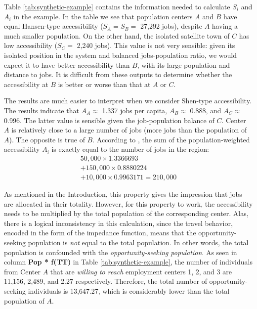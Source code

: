 \documentclass[]{elsarticle} %
\begin{document}
\begin{table}[ht]
\end{table}
 

Table \ref{tab:synthetic-example} contains the information needed to
calculate \(S_i\) and \(A_i\) in the example. In the table we see that
population centers \(A\) and \(B\) have equal Hansen-type accessibility
(\(S_A = S_B=\) 27,292 jobs), despite \(A\) having a much smaller
population. On the other hand, the isolated satellite town of \(C\) has
low accessibility (\(S_C=\) 2,240 jobs). This value is not very
sensible: given its isolated position in the system and balanced
jobs-population ratio, we would expect it to have better accessibility
than \(B\), with its large population and distance to jobs. It is
difficult from these outputs to determine whether the accessibility at
\(B\) is better or worse than that at \(A\) or \(C\).

The results are much easier to interpret when we consider Shen-type
accessibility. The results indicate that \(A_A \approx\) 1.337 jobs per
capita, \(A_B \approx\) 0.888, and \(A_C\approx\) 0.996. The latter
value is sensible given the job-population balance of \(C\). Center
\(A\) is relatively close to a large number of jobs (more jobs than the
population of \(A\)). The opposite is true of \(B\). According to
\citet{shen1998}, the sum of the population-weighted accessibility
\(A_i\) is exactly equal to the number of jobs in the region: \[
\begin{array}{l}
50,000\times 1.3366693 \\
+ 150,000 \times 0.8880224 \\
+ 10,000 \times 0.9963171 = 210,000
\end{array}
\]

As mentioned in the Introduction, this property gives the impression
that jobs are allocated in their totality. However, for this property to
work, the accessibility needs to be multiplied by the total population
of the corresponding center. Alas, there is a logical inconsistency in
this calculation, since the travel behavior, encoded in the form of the
impedance function, means that the opportunity-seeking population is
\emph{not} equal to the total population. In other words, the total
population is confounded with the \emph{opportunity-seeking population}.
As seen in column \textbf{Pop * f(TT)} in Table
\ref{tab:synthetic-example}, the number of individuals from Center \(A\)
that are \emph{willing to reach} employment centers 1, 2, and 3 are
11,156, 2,489, and 2.27 respectively. Therefore, the total number of
opportunity-seeking individuals is 13,647.27, which is considerably
lower than the total population of \(A\).
\end{document}

